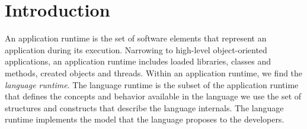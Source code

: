 
\chapter{Introduction}
\minitoc


%
%


An application runtime is the set of software elements that represent an application during its execution. Narrowing to high-level object-oriented applications, an application runtime includes \eg loaded libraries, classes and methods, created objects and threads. Within an application runtime, we find the \emph{language runtime}. The language runtime is the subset of the application runtime that defines the concepts and behavior available in the language we use \ie the set of structures and constructs that describe the language internals. The language runtime implements the model that the language proposes to the developers.

